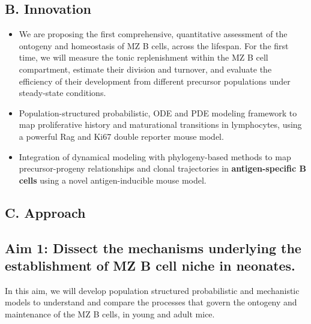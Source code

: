 \documentclass[11pt]{article}
\begin{document}
\subsection*{B. Innovation}
\begin{itemize}
    \item We are proposing the first comprehensive, quantitative assessment of the ontogeny and homeostasis of MZ B cells, across the lifespan.
    For the first time, we will measure the tonic replenishment within the MZ B cell compartment, estimate their division and turnover, and evaluate the efficiency of their development from different precursor populations under steady-state conditions.
    \item Population-structured probabilistic, ODE  and  PDE modeling framework to map proliferative history and maturational transitions in lymphocytes, using a powerful Rag and Ki67 double reporter mouse model. %
    \item Integration of dynamical modeling with phylogeny-based methods to map precursor-progeny relationships and clonal trajectories in \textbf{antigen-specific B cells} using a novel antigen-inducible mouse model. %
    \end{itemize}
    
    




\subsection*{C. Approach}



\subsection*{Aim 1: Dissect the mechanisms underlying the establishment of MZ B cell niche in neonates.}

In this aim, we will develop population structured probabilistic and mechanistic models to understand and compare the processes that govern the ontogeny and maintenance of the MZ B cells, in young and adult mice.
\end{document}
